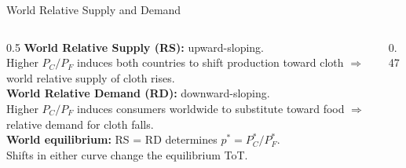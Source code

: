 \documentclass[aspectratio=169]{beamer}
\begin{document}
\begin{frame}{World Relative Supply and Demand}
\begin{columns}
\begin{column}{0.5\textwidth}
\textbf{World Relative Supply (RS):} upward-sloping.\\
Higher $P_C/P_F$ induces both countries to shift production toward cloth $\Rightarrow$ world relative supply of cloth rises.\\[0.4em]
\textbf{World Relative Demand (RD):} downward-sloping.\\
Higher $P_C/P_F$ induces consumers worldwide to substitute toward food $\Rightarrow$ relative demand for cloth falls.\\[0.4em]
\textbf{World equilibrium:} RS = RD determines $p^* = P_C^*/P_F^*$.\\[0.3em]
Shifts in either curve change the equilibrium ToT.
\end{column}
\begin{column}{0.47\textwidth}
\end{column}
\end{columns}
\end{frame}
\end{document}
